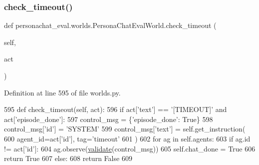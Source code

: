 \subsubsection{\texorpdfstring{check\+\_\+timeout()}{check\_timeout()}}
{\footnotesize\ttfamily def personachat\+\_\+eval.\+worlds.\+Persona\+Chat\+Eval\+World.\+check\+\_\+timeout (\begin{DoxyParamCaption}\item[{}]{self,  }\item[{}]{act }\end{DoxyParamCaption})}



Definition at line 595 of file worlds.\+py.


\begin{DoxyCode}
595     \textcolor{keyword}{def }check\_timeout(self, act):
596         \textcolor{keywordflow}{if} act[\textcolor{stringliteral}{'text'}] == \textcolor{stringliteral}{'[TIMEOUT]'} \textcolor{keywordflow}{and} act[\textcolor{stringliteral}{'episode\_done'}]:
597             control\_msg = \{\textcolor{stringliteral}{'episode\_done'}: \textcolor{keyword}{True}\}
598             control\_msg[\textcolor{stringliteral}{'id'}] = \textcolor{stringliteral}{'SYSTEM'}
599             control\_msg[\textcolor{stringliteral}{'text'}] = self.get\_instruction(
600                 agent\_id=act[\textcolor{stringliteral}{'id'}], tag=\textcolor{stringliteral}{'timeout'}
601             )
602             \textcolor{keywordflow}{for} ag \textcolor{keywordflow}{in} self.agents:
603                 \textcolor{keywordflow}{if} ag.id != act[\textcolor{stringliteral}{'id'}]:
604                     ag.observe(\hyperlink{namespaceparlai_1_1core_1_1worlds_afc3fad603b7bce41dbdc9cdc04a9c794}{validate}(control\_msg))
605             self.chat\_done = \textcolor{keyword}{True}
606             \textcolor{keywordflow}{return} \textcolor{keyword}{True}
607         \textcolor{keywordflow}{else}:
608             \textcolor{keywordflow}{return} \textcolor{keyword}{False}
609 
\end{DoxyCode}
\mbox{\label{classpersonachat__eval_1_1worlds_1_1PersonaChatEvalWorld_a4adecbc6dcc81ec27b249956d9d8efbf}} 
